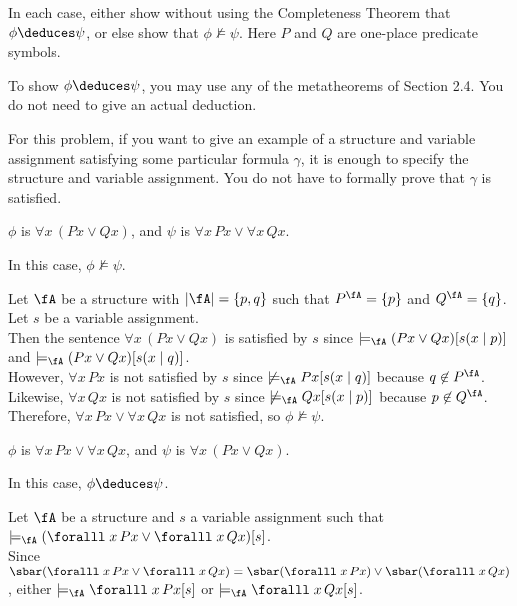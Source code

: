 \begin{problem}

In each case, either show without using the Completeness Theorem that
$\phi \deduces \psi$, or else show that $\phi \not\models \psi$.
Here $P$ and $Q$ are one-place predicate symbols.

To show $\phi \deduces \psi$, you may use any of the metatheorems of Section 2.4.  You do not need to give an actual deduction.

For this problem, if you want to give an example of a structure and variable
assignment satisfying some particular formula $\gamma$,
it is enough to specify the structure and variable assignment.
You do not have to formally prove that $\gamma$ is satisfied.

\begin{enumroman}
  \item $\phi$ is $\forall x \, (Px \lor Qx)$, 
    and $\psi$ is $\forall x \, Px \lor \forall x \, Qx$.
    \begin{Answer}
      In this case, $\phi \not\models \psi$.

      \step
      Let $\fA$ be a structure with $\abs{\fA} = \set{p, q}$ such that
      $P^\fA = \set{p}$ and $Q^\fA = \set{q}$.
      Let $s$ be a variable assignment.\\
      Then the sentence $\forall x \, (Px \lor Qx)$ is satisfied by $s$ since
      $\models_{\fA}(Px \lor Qx)[s(x \mid p)]$ and
      $\models_{\fA}(Px \lor Qx)[s(x \mid q)]$.\\
      However, $\forall x \, Px$ is not satisfied by $s$ since
      $\not \models_{\fA} Px[s(x \mid q)]$ because $q \notin P^\fA$.
      Likewise, $\forall x \, Qx$ is not satisfied by $s$ since
      $\not \models_{\fA} Qx[s(x \mid p)]$ because $p \notin Q^\fA$.\\
      Therefore, $\forall x \, Px \lor \forall x \, Qx$ is not satisfied,
      so $\phi \not\models \psi$.
    \end{Answer}
  \item $\phi$ is $\forall x \, Px \lor \forall x \, Qx$,
    and $\psi$ is $\forall x \, (Px \lor Qx)$.
    \begin{Answer}
      In this case, $\phi \deduces \psi$.

      \step
      Let $\fA$ be a structure and $s$ a variable assignment such that
      $\models_{\fA} (\forall x\, Px \lor \forall x\, Qx)[s]$.\\
      Since $\sbar(\forall x\, Px \lor \forall x\, Qx)
      = \sbar(\forall x\, Px) \lor \sbar(\forall x\, Qx)$,
      either $\models_\fA \forall x\, Px[s]$ or $\models_\fA \forall x\, Qx[s]$.


\end{Answer}
\end{enumroman}
\end{problem}
